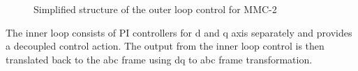 \begin{figure}[H]
\centering


\vspace{5mm}


\caption{Simplified structure of the outer loop control for MMC-2 \cite{saad2015modelisation}}

\end{figure}


The inner loop consists of \gls{PI} controllers for d and q axis separately and provides a decoupled control action. The output from the inner loop control is then translated back to the abc frame using \gls{dq} to abc frame transformation. 

